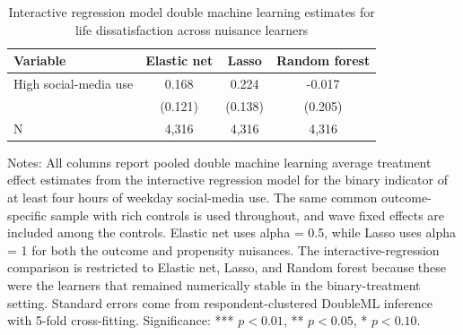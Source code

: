 \begin{table}[!htbp]
\centering
\caption{Interactive regression model double machine learning estimates for life dissatisfaction across nuisance learners}
\label{tab:irm_life_methods}
\begin{tabular}{lccc}
\hline
Variable & Elastic net & Lasso & Random forest
\\
\hline
High social-media use & 0.168 & 0.224 & -0.017
\\
 & (0.121) & (0.138) & (0.205)
\\
N & 4,316 & 4,316 & 4,316
\\
\hline
\end{tabular}
\begin{minipage}{0.95\textwidth}
\footnotesize Notes: All columns report pooled double machine learning average treatment effect estimates from the interactive regression model for the binary indicator of at least four hours of weekday social-media use. The same common outcome-specific sample with rich controls is used throughout, and wave fixed effects are included among the controls. Elastic net uses alpha = 0.5, while Lasso uses alpha = 1 for both the outcome and propensity nuisances. The interactive-regression comparison is restricted to Elastic net, Lasso, and Random forest because these were the learners that remained numerically stable in the binary-treatment setting. Standard errors come from respondent-clustered DoubleML inference with 5-fold cross-fitting. Significance: *** \(p < 0.01\), ** \(p < 0.05\), * \(p < 0.10\).
\end{minipage}
\end{table}
